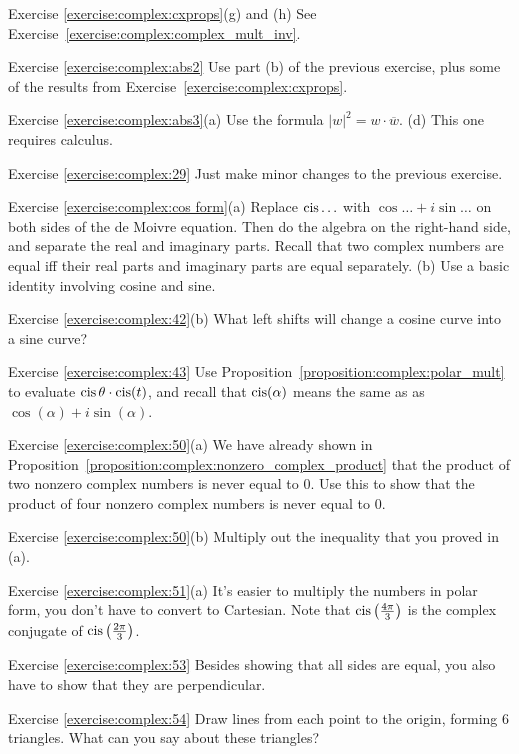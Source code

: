 \noindent Exercise \ref{exercise:complex:cxprops}(g) and (h)
See Exercise~\ref{exercise:complex:complex_mult_inv}.


\noindent Exercise \ref{exercise:complex:abs2}
Use part (b) of the previous exercise, plus
some of the results from Exercise~\ref{exercise:complex:cxprops}.


\noindent Exercise \ref{exercise:complex:abs3}(a)
Use the formula $|w|^2 = w\cdot \overline{w}$.  (d) This one requires calculus.

\noindent Exercise \ref{exercise:complex:29}
Just make minor changes to the previous exercise.

\noindent Exercise \ref{exercise:complex:cos form}(a) Replace $\operatorname{cis} \ldots$ with $\cos \ldots + i \sin \ldots$ on both sides of the de Moivre equation.  Then do the algebra on the right-hand side, and separate the real and imaginary parts. Recall that two complex numbers are equal iff their real parts and imaginary parts are equal separately.
(b)
Use a basic identity involving cosine and sine.

\noindent Exercise \ref{exercise:complex:42}(b)
What left shifts will change a cosine curve into a sine curve?

\noindent Exercise \ref{exercise:complex:43}
 Use Proposition~\ref{proposition:complex:polar_mult} to evaluate $\operatorname{cis}\theta \cdot \operatorname{cis}( t)$, and recall that $\operatorname{cis}(\alpha)$ means the same as as $\cos(\alpha) + i \sin(\alpha)$.


\noindent Exercise \ref{exercise:complex:50}(a)
We have already shown  in Proposition~\ref{proposition:complex:nonzero_complex_product} that the product of two nonzero complex numbers is never equal to 0. Use this to show that the product of four nonzero complex numbers is never equal to 0.


\noindent Exercise \ref{exercise:complex:50}(b)
Multiply out the inequality that you proved in (a).

\noindent Exercise \ref{exercise:complex:51}(a)
It's easier to multiply the numbers in polar form, you don't have to convert to Cartesian.  Note that $\operatorname{cis}\left(\frac{4\pi}{3}\right)$ is the complex conjugate of $\operatorname{cis}\left(\frac{2\pi}{3}\right)$.

\noindent Exercise \ref{exercise:complex:53}
Besides showing that all sides are equal, you also have to show that they are perpendicular.

\noindent Exercise \ref{exercise:complex:54}
Draw lines from each point to the origin, forming 6 triangles. What can you say about these triangles?


